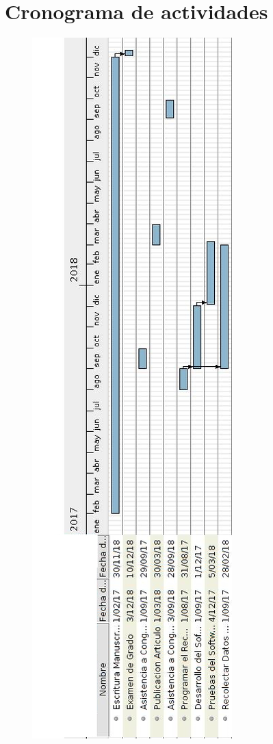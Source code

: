 \section{Cronograma de actividades}

\begin{figure}[h]
\centering
\includegraphics[width=0.3\columnwidth]{./CapituloI/Imagenes/Cronograma.jpg}
\end{figure}


